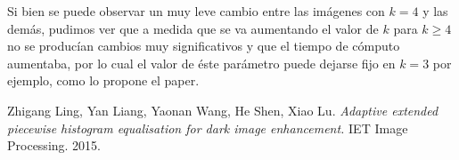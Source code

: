\documentclass[10pt, a4paper]{article}
\begin{document}
Si bien se puede observar un muy leve cambio entre las imágenes con $k=4$ y las demás, pudimos ver que a medida que se va aumentando el valor de $k$ para $k \geq 4$ no se producían cambios muy significativos y que el tiempo de cómputo aumentaba, por lo cual el valor de éste parámetro puede dejarse fijo en $k=3$ por ejemplo, como lo propone el paper.

\newpage 

\begin{thebibliography}{9}
Zhigang Ling, Yan Liang, Yaonan Wang, He Shen, Xiao Lu. \textit{Adaptive extended piecewise histogram equalisation for dark image enhancement.} IET Image Processing. 2015.
\end{thebibliography}
\end{document}
